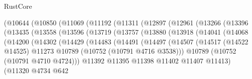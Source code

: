 \begin{lexlean}{RustCore}
\begin{coremodule}
                    (@10644
                      (@10850
                        (@11069
                          (@11192
                            (@11311
                              (@12897
                                (@12961
                                  (@13266
                                    (@13396
                                      (@13435
                                        (@13558
                                          (@13596
                                            (@13719
                                              (@13757
                                                (@13880
                                                  (@13918
                                                    (@14041
                                                      (@14068
                                                        (@14200
                                                          (@14302
                                                            (@14429
                                                              (@14483
                                                                (@14491
                                                                  (@14497
                                                                    (@14507
                                                                      (@14517
                                                                        (@14522 @14525)
                                                                        @11273
                                                                        @10789
                                                                        (@10752
                                                                          (@10791 @4716 @3538)))
                                                                      @10789
                                                                      (@10752 (@10791 @4710 @4724)))
                                                                    @11392
                                                                    @11395
                                                                    @11398
                                                                    @11402
                                                                    @11407
                                                                    @11413)
                                                                  (@11320
                                                                    @4734
                                                                    @642

\end{coremodule}
\end{lexlean}
